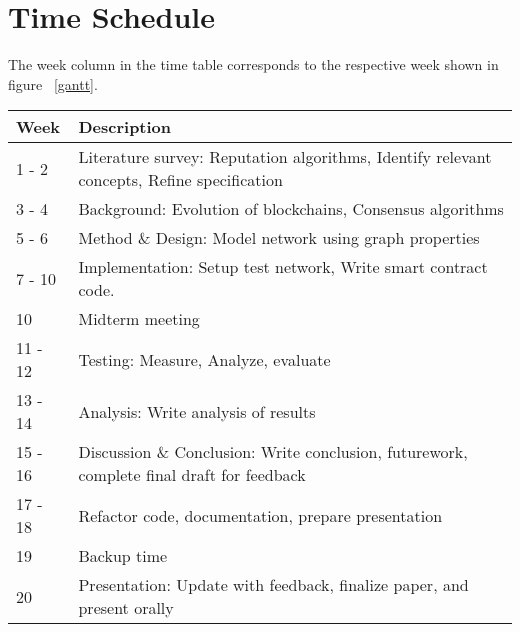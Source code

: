 \documentclass[a4paper,11pt,dvipsnames]{article}
\begin{document}
	\section*{Time Schedule}
	The week column in the time table corresponds to the respective week 
	shown in figure ~\ref{gantt}.
	\begin{center}
		\begin{tabular}{ |m{1.5cm}|m{30em} | } 
			\hline
			\textbf{Week} & \textbf{Description}\\
			\hline
			1 - 2 & Literature survey: Reputation algorithms, Identify relevant 
			concepts, Refine specification\\
			3 - 4 & Background: Evolution of blockchains, Consensus algorithms \\
			5 - 6 & Method \& Design: Model network using graph properties \\
			7 - 10 & Implementation: Setup test network, Write smart contract 
			code. \\
			10 & Midterm meeting \\
			11 - 12 & Testing: Measure, Analyze, evaluate \\
			13 - 14 & Analysis: Write analysis of results \\
			15 - 16 & Discussion \& Conclusion: Write conclusion, futurework, 
			complete final draft for feedback \\
			17 - 18 & Refactor code, documentation, prepare presentation \\
			19 & Backup time \\
			20 & Presentation: Update with feedback, finalize paper, 
			and present orally \\	
			\hline
		\end{tabular}
	\end{center}
\end{document}

